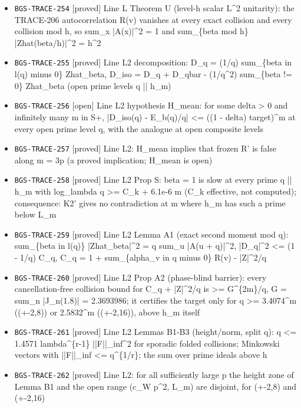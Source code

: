 \begin{itemize}
  \item \texttt{BGS-TRACE-254} [proved] Line L Theorem U (level-h scalar L\textasciicircum{}2 unitarity): the TRACE-206 autocorrelation R(v) vanishes at every exact collision and every collision mod h, so sum\_x |A(x)|\textasciicircum{}2 = 1 and sum\_\{beta mod h\} |Zhat(beta/h)|\textasciicircum{}2 = h\textasciicircum{}2
  \item \texttt{BGS-TRACE-255} [proved] Line L2 decomposition: D\_q = (1/q) sum\_\{beta in l(q) minus 0\} Zhat\_beta, D\_iso = D\_q + D\_qbar - (1/q\textasciicircum{}2) sum\_\{beta != 0\} Zhat\_beta (open prime levels q || h\_m)
  \item \texttt{BGS-TRACE-256} [open] Line L2 hypothesis H\_mean: for some delta > 0 and infinitely many m in S+, |D\_iso(q) - E\_b(q)/q| <= ((1 - delta) target)\textasciicircum{}m at every open prime level q, with the analogue at open composite levels
  \item \texttt{BGS-TRACE-257} [proved] Line L2: H\_mean implies that frozen R' is false along m = 3p (a proved implication; H\_mean is open)
  \item \texttt{BGS-TRACE-258} [proved] Line L2 Prop S: beta = 1 is slow at every prime q || h\_m with log\_lambda q >= C\_k + 6.1e-6 m (C\_k effective, not computed); consequence: K2' gives no contradiction at m where h\_m has such a prime below L\_m
  \item \texttt{BGS-TRACE-259} [proved] Line L2 Lemma A1 (exact second moment mod q): sum\_\{beta in l(q)\} |Zhat\_beta|\textasciicircum{}2 = q sum\_u |A(u + q)|\textasciicircum{}2, |D\_q|\textasciicircum{}2 <= (1 - 1/q) C\_q, C\_q = 1 + sum\_\{alpha\_v in q minus 0\} R(v) - |Z|\textasciicircum{}2/q
  \item \texttt{BGS-TRACE-260} [proved] Line L2 Prop A2 (phase-blind barrier): every cancellation-free collision bound for C\_q + |Z|\textasciicircum{}2/q is >= G\textasciicircum{}\{2m\}/q, G = sum\_n |J\_n(1.8)| = 2.3693986; it certifies the target only for q >= 3.4074\textasciicircum{}m ((+-2,8)) or 2.5832\textasciicircum{}m ((+-2,16)), above h\_m itself
  \item \texttt{BGS-TRACE-261} [proved] Line L2 Lemmas B1-B3 (height/norm, split q): q <= 1.4571 lambda\textasciicircum{}\{r-1\} ||F||\_inf\textasciicircum{}2 for sporadic folded collisions; Minkowski vectors with ||F||\_inf <= q\textasciicircum{}\{1/r\}; the sum over prime ideals above h
  \item \texttt{BGS-TRACE-262} [proved] Line L2: for all sufficiently large p the height zone of Lemma B1 and the open range (c\_W p\textasciicircum{}2, L\_m) are disjoint, for (+-2,8) and (+-2,16)

\end{itemize}
